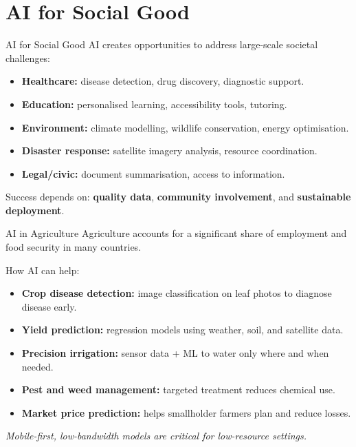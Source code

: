 \documentclass[10pt]{beamer}
\begin{document}
\section{AI for Social Good}

\begin{frame}{AI for Social Good}
    AI creates opportunities to address large-scale societal challenges:
    \begin{itemize}
        \item \textbf{Healthcare:} disease detection, drug discovery, diagnostic support.
        \item \textbf{Education:} personalised learning, accessibility tools, tutoring.
        \item \textbf{Environment:} climate modelling, wildlife conservation, energy optimisation.
        \item \textbf{Disaster response:} satellite imagery analysis, resource coordination.
        \item \textbf{Legal/civic:} document summarisation, access to information.
    \end{itemize}

    \vspace{0.15cm}
    Success depends on: \textbf{quality data}, \textbf{community involvement}, and \textbf{sustainable deployment}.
\end{frame}

\begin{frame}{AI in Agriculture}
    Agriculture accounts for a significant share of employment and food security in many countries.

    \vspace{0.2cm}
    How AI can help:
    \begin{itemize}
        \item \textbf{Crop disease detection:} image classification on leaf photos to diagnose disease early.
        \item \textbf{Yield prediction:} regression models using weather, soil, and satellite data.
        \item \textbf{Precision irrigation:} sensor data + ML to water only where and when needed.
        \item \textbf{Pest and weed management:} targeted treatment reduces chemical use.
        \item \textbf{Market price prediction:} helps smallholder farmers plan and reduce losses.
    \end{itemize}

    \vspace{0.15cm}
    \textit{Mobile-first, low-bandwidth models are critical for low-resource settings.}
\end{frame}
\end{document}
